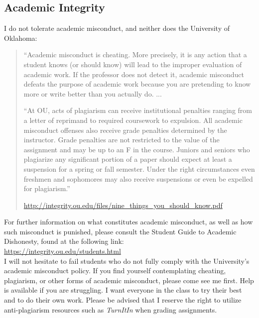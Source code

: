 \documentclass[11pt,english]{article}
\begin{document}

\subsection*{Academic Integrity}

I do not tolerate academic misconduct, and neither does the University of Oklahoma: 
\begin{quotation}
``Academic misconduct is cheating. More precisely, it is any action that a student knows (or should know) will lead to the improper evaluation of academic work. If the professor does not detect it, academic misconduct defeats the purpose of academic work because you are pretending to know more or write better than you actually do. ... 

``At OU, acts of plagiarism can receive institutional penalties ranging from a letter of reprimand to required coursework to expulsion. All academic misconduct offenses also receive grade penalties determined by the instructor. Grade penalties are not restricted to the value of the assignment and may be up to an F in the course. Juniors and seniors who plagiarize any significant portion of a paper should expect at least a suspension for a spring or fall semester. Under the right circumstances even freshmen and sophomores may also receive suspensions or even be expelled for plagiarism.'' 

\textemdash \url{http://integrity.ou.edu/files/nine_things_you_should_know.pdf}
\end{quotation}
For further information on what constitutes academic misconduct, as well as how such misconduct is punished, please consult the Student Guide to Academic Dishonesty, found at the following link:\\ \url{https://integrity.ou.edu/students.html}\\

I will not hesitate to fail students who do not fully comply with the University's academic misconduct policy. If you find yourself contemplating cheating, plagiarism, or other forms of academic misconduct, please come see me first. Help is available if you are struggling. I want everyone in the class to try their best and to do their own work. Please be advised that I reserve the right to utilize anti-plagiarism resources such as \emph{TurnItIn} when grading assignments.
\end{document}
